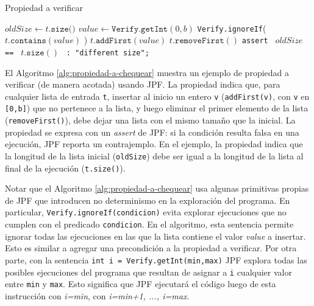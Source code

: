 \begin{algorithm}[H]
  \caption{Propiedad a verificar}
  \label{alg:propiedad-a-chequear}
  $oldSize \gets t.\texttt{size()}$\;
  $value \gets \texttt{Verify.getInt}(0, b)$\;
  \texttt{Verify.ignoreIf}( $t.\texttt{contains}(value)$ )\;
  $t.\texttt{addFirst}(value)$\;
  $t.\texttt{removeFirst}()$\;
  \texttt{assert } $oldSize$ \texttt{ == } $t.\texttt{size}()$
  \texttt{ : "different size";}\;
\end{algorithm}

El Algoritmo \ref{alg:propiedad-a-chequear} muestra un ejemplo de propiedad a
verificar (de manera acotada) usando JPF. La propiedad indica que, para cualquier lista 
de entrada \texttt{t}, insertar al inicio un entero \texttt{v}
(\texttt{addFirst(v)}, con \texttt{v} en \texttt{[0,b]}) que no pertenece a la lista,
y luego eliminar el primer elemento de la lista (\texttt{removeFirst()}), debe
dejar una lista con el mismo tamaño que la inicial.
La propiedad se expresa con un \emph{assert} de JPF: si la condición resulta falsa en una ejecución, JPF reporta un
contrajemplo. En el ejemplo, la propiedad indica que la longitud de la lista
inicial (\texttt{oldSize}) debe ser igual a la longitud de la lista al final de la
ejecución (\texttt{t.size()}). 

Notar que el Algoritmo \ref{alg:propiedad-a-chequear} usa algunas primitivas
propias de JPF que introducen no determinismo en la exploración del programa. 
En particular, \texttt{Verify.ignoreIf(condicion)} evita explorar ejecuciones
que no cumplen con el predicado \texttt{condicion}. En el algoritmo, esta
sentencia permite ignorar todas las ejecuciones en las que la lista contiene el valor \emph{value} a insertar. Esto es similar a agregar una precondición a la propiedad a verificar.
Por otra parte, con la sentencia \texttt{int i =
Verify.getInt(min,max)} JPF explora todas las
posibles ejecuciones del programa que resultan de asignar a \texttt{i} cualquier
valor entre \texttt{min} y \texttt{max}. Esto significa que JPF ejecutará el código luego
de esta instrucción con \emph{i=min}, con \emph{i=min+1, ..., i=max}. 

